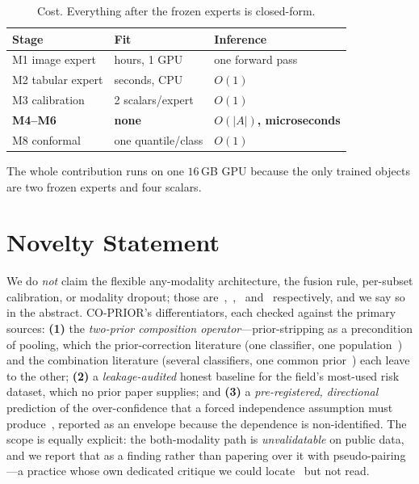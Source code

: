 \documentclass[sigplan,nonacm,screen]{acmart}
\begin{document}
\begin{table}[t]
\caption{Cost. Everything after the frozen experts is closed-form.}
\label{tab:cost}
\footnotesize
\setlength{\tabcolsep}{4pt}
\begin{tabular}{@{}lll@{}}
\toprule
\textbf{Stage} & \textbf{Fit} & \textbf{Inference} \\
\midrule
M1 image expert & hours, 1 GPU & one forward pass \\
M2 tabular expert & seconds, CPU & $O(1)$ \\
M3 calibration & 2 scalars/expert & $O(1)$ \\
\textbf{M4--M6} & \textbf{none} & \textbf{$O(|A|)$, microseconds} \\
M8 conformal & one quantile/class & $O(1)$ \\
\bottomrule
\end{tabular}
\end{table}

The whole contribution runs on one $16$\,GB GPU because the only trained objects are two frozen experts and four scalars.

\section{Novelty Statement}

We do \emph{not} claim the flexible any-modality architecture, the fusion rule, per-subset calibration, or modality dropout; those are~\cite{chen2022proben},~\cite{genest1986combining},~\cite{chlon2025aecf} and~\cite{gu2025modality} respectively, and we say so in the abstract. CO-PRIOR's differentiators, each checked against the primary sources: \textbf{(1)} the \emph{two-prior composition operator}---prior-stripping as a precondition of pooling, which the prior-correction literature (one classifier, one population~\cite{saerens2002adjusting,alexandari2020maximum,godau2023deployment}) and the combination literature (several classifiers, one common prior~\cite{kittler1998combining,genest1986combining,chen2022proben}) each leave to the other; \textbf{(2)} a \emph{leakage-audited} honest baseline for the field's most-used risk dataset, which no prior paper supplies; and \textbf{(3)} a \emph{pre-registered, directional} prediction of the over-confidence that a forced independence assumption must produce~\cite{grill2017comparison}, reported as an envelope because the dependence is non-identified. The scope is equally explicit: the both-modality path is \emph{unvalidatable} on public data, and we report that as a finding rather than papering over it with pseudo-pairing---a practice whose own dedicated critique we could locate~\cite{poh2006using} but not read.
\end{document}
